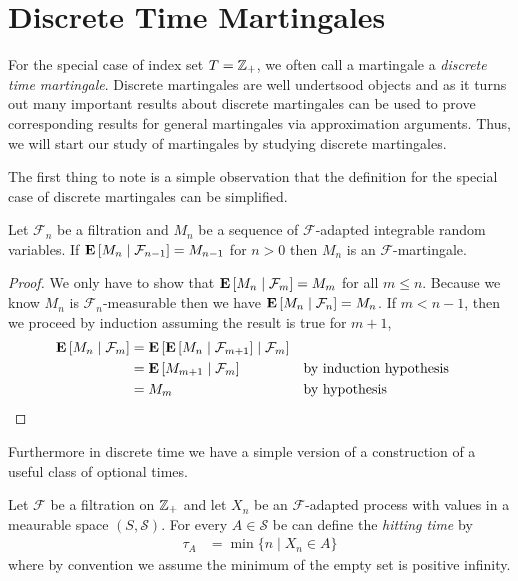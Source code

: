 \section{Discrete Time Martingales}
For the special case of index set $T = \integers_+$, we often call a
martingale a \emph{discrete time martingale}.  Discrete martingales are well
undertsood objects and as it turns out many important results about discrete
martingales can be used to prove corresponding results for general martingales via approximation
arguments.  Thus, we will start our study of martingales by studying
discrete martingales.

The first thing to note is a simple observation that the definition
for the special case of discrete martingales can be simplified.
\begin{lem}Let $\mathcal{F}_n$ be a filtration and $M_n$ be a sequence
  of $\mathcal{F}$-adapted integrable random variables.  If
  $\cexpectationlong{\mathcal{F}_{n-1}}{M_n} = M_{n-1}$ for $n > 0$ then $M_n$
  is an $\mathcal{F}$-martingale.
\end{lem}
\begin{proof}We only have to show that
  $\cexpectationlong{\mathcal{F}_m}{M_n} = M_m$ for all $m \leq n$.
  Because we know $M_n$ is $\mathcal{F}_n$-measurable then we have
  $\cexpectationlong{\mathcal{F}_n}{M_n} = M_n$.  If $m < n-1$, then we
  proceed by induction
  assuming the result is true for $m+1$,
\begin{align*}
\cexpectationlong{\mathcal{F}_m}{M_n} &=
\cexpectationlong{\mathcal{F}_m}{\cexpectationlong{\mathcal{F}_{m+1}}{M_n}} \\
&=\cexpectationlong{\mathcal{F}_m}{M_{m+1}} & & \text{by induction hypothesis}\\
&= M_m & & \text{by hypothesis}
\end{align*}
\end{proof}

Furthermore in discrete time we have a simple version of a
construction of a useful class of optional times.
\begin{defn}Let $\mathcal{F}$ be a filtration on $\integers_+$ and let
  $X_n$ be an $\mathcal{F}$-adapted process with values in a meaurable
  space $(S, \mathcal{S})$.  For every $A \in \mathcal{S}$ be can
  define the \emph{hitting time} by
\begin{align*}
\tau_A &= \min \lbrace n \mid X_n \in A \rbrace
\end{align*}
where by convention we assume the minimum of the empty set is positive infinity.
\end{defn}

